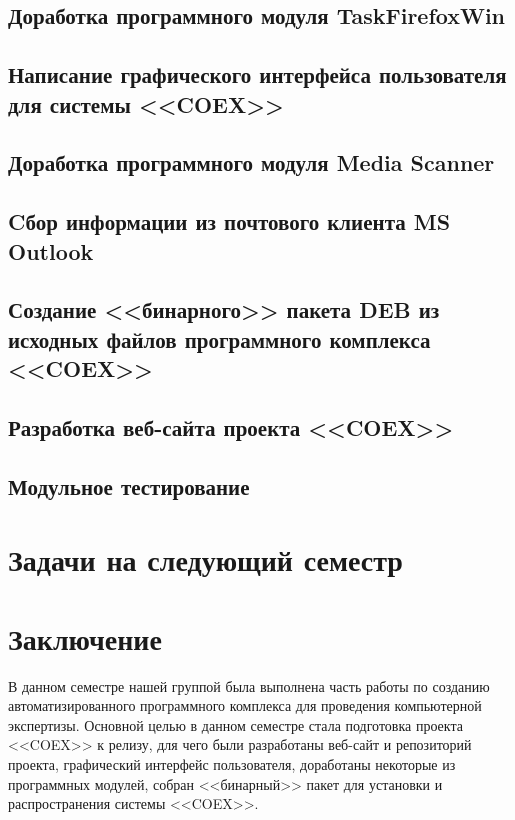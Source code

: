 \subsection{ Доработка программного модуля TaskFirefoxWin }


\newpage
\subsection{ Написание графического интерфейса пользователя для системы <<COEX>> }

\newpage
\subsection{ Доработка программного модуля Media Scanner }

 
\newpage
\subsection{ Cбор информации из почтового клиента MS Outlook }

\newpage
\subsection { Создание <<бинарного>> пакета DEB из исходных файлов программного комплекса <<COEX>> } 


\newpage 
\subsection{ Разработка веб-сайта проекта <<COEX>> }


\newpage
\subsection{ Модульное тестирование } 


\newpage
\section{Задачи на следующий семестр}


\newpage
\section*{Заключение}
В данном семестре нашей группой была выполнена часть работы по созданию автоматизированного программного комплекса для проведения компьютерной экспертизы. Основной целью в данном семестре стала подготовка проекта <<COEX>> к релизу, для чего были разработаны веб-сайт и репозиторий проекта, графический интерфейс пользователя, доработаны некоторые из программных модулей, собран <<бинарный>> пакет для установки и распространения системы <<COEX>>. 
 
